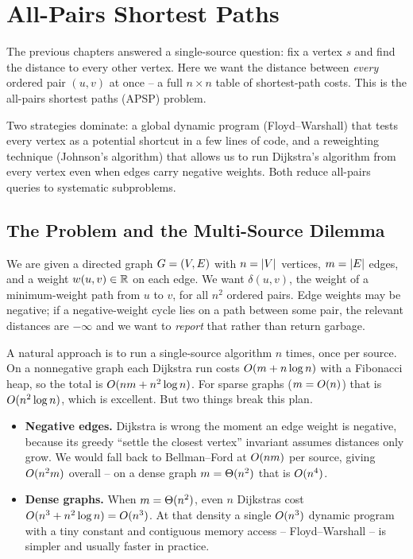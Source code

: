 \chapter{All-Pairs Shortest Paths}

The previous chapters answered a single-source question: fix a vertex $s$ and find the
distance to every other vertex. Here we want the distance between
\emph{every} ordered pair $(u,v)$ at once -- a full $n \times n$ table of shortest-path
costs. This is the all-pairs shortest paths (APSP) problem.

Two strategies dominate: a global dynamic program (Floyd--Warshall) that tests every vertex as a
potential shortcut in a few lines of code, and a reweighting
technique (Johnson's algorithm) that allows us to run Dijkstra's algorithm from every vertex even when edges carry
negative weights. Both reduce all-pairs queries to systematic subproblems.

\chapterline

\section{The Problem and the Multi-Source Dilemma}
\label{ch09:problem}

\begin{focusbox}
We are given a directed graph $G=(V,E)$ with $n=\lvert V\rvert$ vertices, $m=\lvert E\rvert$ edges, and a
weight $w(u,v)\in\mathbb{R}$ on each edge. We want $\delta(u,v)$, the weight of a minimum-weight path
from $u$ to $v$, for all $n^2$ ordered pairs. Edge weights may be negative; if a negative-weight
cycle lies on a path between some pair, the relevant distances are $-\infty$ and we want to
\emph{report} that rather than return garbage.
\end{focusbox}

A natural approach is to run a single-source algorithm $n$ times, once per source. On a
nonnegative graph each Dijkstra run costs $O(m + n\log n)$ with a Fibonacci heap, so the total
is $O(nm + n^2\log n)$. For sparse graphs ($m=O(n)$) that is $O(n^2\log n)$, which is
excellent. But two things break this plan.

\begin{itemize}
  \item \textbf{Negative edges.} Dijkstra is wrong the moment an edge weight is negative, because
        its greedy ``settle the closest vertex'' invariant assumes distances only grow. We would
        fall back to Bellman--Ford at $O(nm)$ per source, giving $O(n^2 m)$ overall -- on a dense
        graph $m=\Theta(n^2)$ that is $O(n^4)$.
  \item \textbf{Dense graphs.} When $m=\Theta(n^2)$, even $n$ Dijkstras cost $O(n^3 + n^2\log n)=O(n^3)$.
        At that density a single $O(n^3)$ dynamic program with a tiny constant and contiguous memory
        access -- Floyd--Warshall -- is simpler and usually faster in practice.
\end{itemize}

